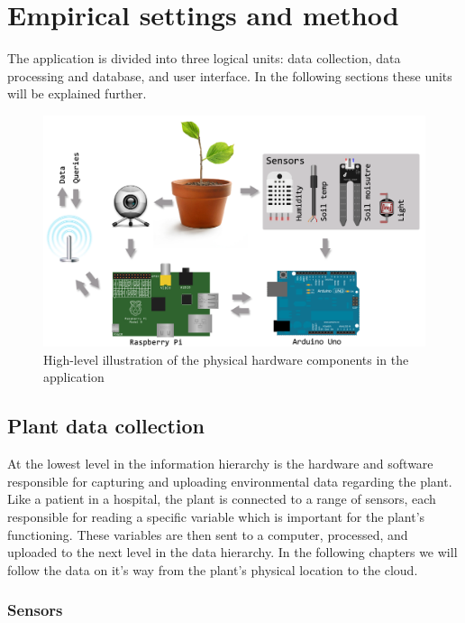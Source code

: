 \chapter{Empirical settings and method}
The application is divided into three logical units: data collection, data processing and database, and user interface. In the following sections these units will be explained further. 

\begin{figure}
\centering
\includegraphics[width=1\textwidth]{img/hardware/application.png}
\caption{High-level illustration of the physical hardware components in the application}
\label{fig:application}
\end{figure}

\section{Plant data collection}
At the lowest level in the information hierarchy is the hardware and software responsible for capturing and uploading environmental data regarding the plant. Like a patient in a hospital, the plant is connected to a range of sensors, each responsible for reading a specific variable which is important for the plant’s functioning. These variables are then sent to a computer, processed, and uploaded to the next level in the data hierarchy. In the following chapters we will follow the data on it’s way from the plant’s physical location to the cloud.

\subsection{Sensors}

